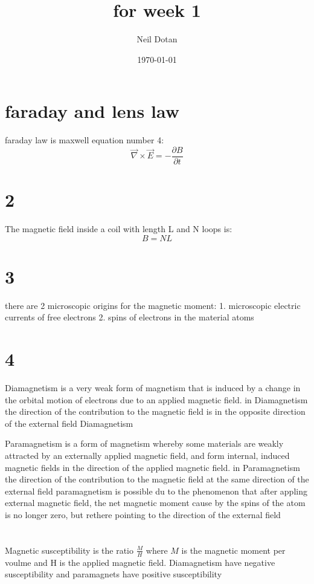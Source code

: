 \documentclass{article}
\title{for week 1}
\author{Neil Dotan}
\date{\today}
\begin{document}
\maketitle
\section{faraday and lens law}
faraday law is maxwell equation number 4:
$$\vec{\nabla} \times \vec{E} = -\frac{\partial B}{\partial t} $$

\section{2}
The magnetic field inside a coil with length L and N loops is:
$$B = NL$$

\section{3}
there are 2 microscopic origins for the magnetic moment:
1. microscopic electric currents of free electrons
2. spins of electrons in the material atoms

\section{4}
Diamagnetism is a very weak form of magnetism that is induced by a change in the orbital motion of electrons due to an applied magnetic field.
in Diamagnetism the direction of the contribution to the magnetic field is in the opposite direction of the external field
Diamagnetism

Paramagnetism is a form of magnetism whereby some materials are weakly attracted by an externally applied magnetic field, and form internal, induced magnetic fields in the direction of the applied magnetic field.
in Paramagnetism the direction of the contribution to the magnetic field at the same direction of the external field
paramagnetism is possible du to the phenomenon that after appling external magnetic field,
the net magnetic moment cause by the spins of the atom is no longer zero, but rethere pointing to the direction of the external field

\section{}
Magnetic susceptibility is the ratio $\frac{M}{H}$ where $M$ is the magnetic moment per voulme
and H is the applied magnetic field. Diamagnetism have negative susceptibility and paramagnets
have positive susceptibility
\end{document}
